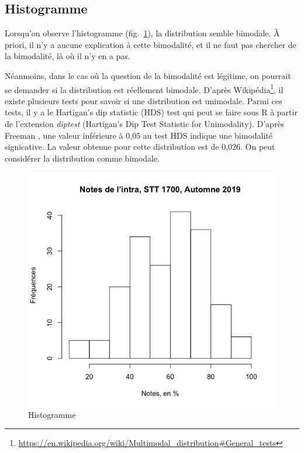 \documentclass[10pt,twocolumn]{article}
\begin{document}
\subsection{Histogramme}
\label{histogramme}
Lorsqu’on observe l’histogramme (fig.~\ref{intraHist}), la distribution semble bimodale. À priori, il n’y a aucune explication à cette bimodalité, et il ne faut pas chercher de la bimodalité, là où il n’y en a pas.

Néanmoins, dans le cas où la question de la bimodalité est légitime, on pourrait se demander si la distribution est réellement bimodale. D’après Wikipédia\footnote{\url{https://en.wikipedia.org/wiki/Multimodal\_distribution\#General\_tests}}, il existe plusieurs tests pour savoir si une distribution est unimodale. Parmi ces tests, il y a le Hartigan’s dip statistic (HDS) test qui peut se faire sous R à partir de l’extension \textit{diptest} (Hartigan's Dip Test Statistic for Unimodality). D’après Freeman \cite{Freeman:2013aa}, une valeur inférieure à 0,05 au test HDS indique une bimodalité signicative. La valeur obtenue pour cette distribution est de 0,026. On peut considérer la distribution comme bimodale.



\begin{figure}[htbp]
	\caption{Histogramme}
	\label{intraHist}
	\centering
	\includegraphics[width=\linewidth]{d1_intraHist}
\end{figure}
\end{document}
